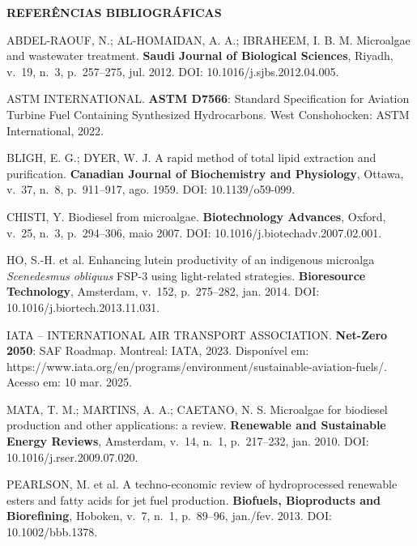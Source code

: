 
\vspace{1\baselineskip}
{\centering\bfseries REFERÊNCIAS BIBLIOGRÁFICAS\par}
\begingroup
\vspace{-0.5\baselineskip}
\singlespacing
\setlength{\parskip}{\baselineskip}
\setlength{\parindent}{0pt}

ABDEL-RAOUF, N.; AL-HOMAIDAN, A. A.; IBRAHEEM, I. B. M. Microalgae and wastewater treatment. \textbf{Saudi Journal of Biological Sciences}, Riyadh, v.~19, n.~3, p.~257--275, jul. 2012. DOI: 10.1016/j.sjbs.2012.04.005.

ASTM INTERNATIONAL. \textbf{ASTM D7566}: Standard Specification for Aviation Turbine Fuel Containing Synthesized Hydrocarbons. West Conshohocken: ASTM International, 2022.

BLIGH, E. G.; DYER, W. J. A rapid method of total lipid extraction and purification. \textbf{Canadian Journal of Biochemistry and Physiology}, Ottawa, v.~37, n.~8, p.~911--917, ago. 1959. DOI: 10.1139/o59-099.

CHISTI, Y. Biodiesel from microalgae. \textbf{Biotechnology Advances}, Oxford, v.~25, n.~3, p.~294--306, maio 2007. DOI: 10.1016/j.biotechadv.2007.02.001.

HO, S.-H. et al. Enhancing lutein productivity of an indigenous microalga \textit{Scenedesmus obliquus} FSP-3 using light-related strategies. \textbf{Bioresource Technology}, Amsterdam, v.~152, p.~275--282, jan. 2014. DOI: 10.1016/j.biortech.2013.11.031.

IATA -- INTERNATIONAL AIR TRANSPORT ASSOCIATION. \textbf{Net-Zero 2050}: SAF Roadmap. Montreal: IATA, 2023. Disponível em: https://www.iata.org/en/programs/environment/sustainable-aviation-fuels/. Acesso em: 10 mar. 2025.

MATA, T. M.; MARTINS, A. A.; CAETANO, N. S. Microalgae for biodiesel production and other applications: a review. \textbf{Renewable and Sustainable Energy Reviews}, Amsterdam, v.~14, n.~1, p.~217--232, jan. 2010. DOI: 10.1016/j.rser.2009.07.020.

PEARLSON, M. et al. A techno-economic review of hydroprocessed renewable esters and fatty acids for jet fuel production. \textbf{Biofuels, Bioproducts and Biorefining}, Hoboken, v.~7, n.~1, p.~89--96, jan./fev. 2013. DOI: 10.1002/bbb.1378.

